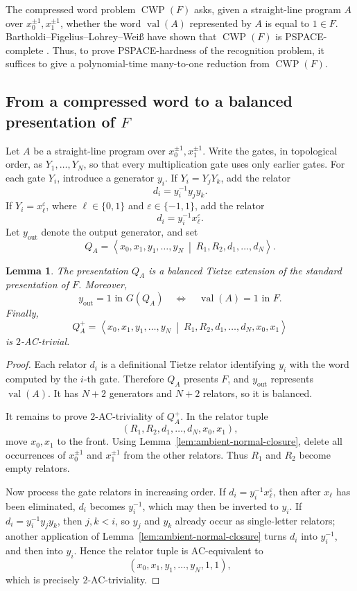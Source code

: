\documentclass[a4paper,11pt,reqno]{amsart}
\newtheorem{lemma}[theorem]{Lemma}
\theoremstyle{definition}
\theoremstyle{remark}
\DeclareMathOperator{\CWP}{CWP}
\DeclareMathOperator{\val}{val}
\begin{document}
	The compressed word problem $\CWP(F)$ asks, given a straight-line program $A$
	over $x_0^{\pm1},x_1^{\pm1}$, whether the word $\val(A)$ represented by
	$A$ is equal to $1\in F$. Bartholdi--Figelius--Lohrey--Wei\ss{} have shown that
	$\CWP(F)$ is PSPACE-complete \cite{BFLaW}. Thus, to prove
	PSPACE-hardness of the recognition problem, it suffices to give a
	polynomial-time many-to-one reduction from $\CWP(F)$.
	
	\subsection{From a compressed word to a balanced presentation of \texorpdfstring{$F$}{F}}
	\label{sec:cw-to-pres}
	
	Let $A$ be a straight-line program over $x_0^{\pm1},x_1^{\pm1}$. Write the gates, in topological order, as $Y_1,\ldots,Y_N$, so that every multiplication gate uses only earlier gates. For each gate
	$Y_i$, introduce a generator $y_i$. If $Y_i=Y_jY_k$, add the relator
	\[
	d_i=y_i^{-1}y_jy_k.
	\]
	If $Y_i=x_\ell^\varepsilon$, where $\ell\in\{0,1\}$ and
	$\varepsilon\in\{-1,1\}$, add the relator
	\[
	d_i=y_i^{-1}x_\ell^\varepsilon.
	\]
	Let $y_{\mathrm{out}}$ denote the output generator, and set
	\[
	Q_A=
	\left\langle
	x_0,x_1,y_1,\dots,y_N
	\ \middle|\
	R_1,R_2,d_1,\dots,d_N
	\right\rangle .
	\]
	
	\begin{lemma}\label{lem:QA}
		The presentation $Q_A$ is a balanced Tietze extension of the standard
		presentation of $F$. Moreover,
		\[
		y_{\mathrm{out}}=1\text{ in }G(Q_A)
		\quad\Longleftrightarrow\quad
		\val(A)=1\text{ in }F.
		\]
		Finally,
		\[
		Q_A^+=
		\left\langle
		x_0,x_1,y_1,\dots,y_N
		\ \middle|\
		R_1,R_2,d_1,\dots,d_N,x_0,x_1
		\right\rangle
		\]
		is $2$-AC-trivial.
	\end{lemma}
	
	\begin{proof}
		Each relator $d_i$ is a definitional Tietze relator identifying $y_i$ with
		the word computed by the $i$-th gate. Therefore $Q_A$ presents $F$, and
		$y_{\mathrm{out}}$ represents $\val(A)$. It has $N+2$ generators and
		$N+2$ relators, so it is balanced.
		
		It remains to prove $2$-AC-triviality of $Q_A^+$. In the relator tuple
		\[
		(R_1,R_2,d_1,\dots,d_N,x_0,x_1),
		\]
		move $x_0,x_1$ to the front. Using Lemma~\ref{lem:ambient-normal-closure},
		delete all occurrences of $x_0^{\pm1}$ and $x_1^{\pm1}$ from the other
		relators. Thus $R_1$ and $R_2$ become empty relators.
		
		Now process the gate relators in increasing order. If
		$d_i=y_i^{-1}x_\ell^\varepsilon$, then after $x_\ell$ has been eliminated,
		$d_i$ becomes $y_i^{-1}$, which may then be inverted to $y_i$. If
		$d_i=y_i^{-1}y_jy_k$, then $j,k<i$, so $y_j$ and $y_k$ already occur as single-letter relators; another application of Lemma~\ref{lem:ambient-normal-closure}
		turns $d_i$ into $y_i^{-1}$, and then into $y_i$. Hence the relator tuple
		is AC-equivalent to
		\[
		(x_0,x_1,y_1,\dots,y_N,1,1),
		\]
		which is precisely $2$-AC-triviality.
	\end{proof}
	
\end{document}
